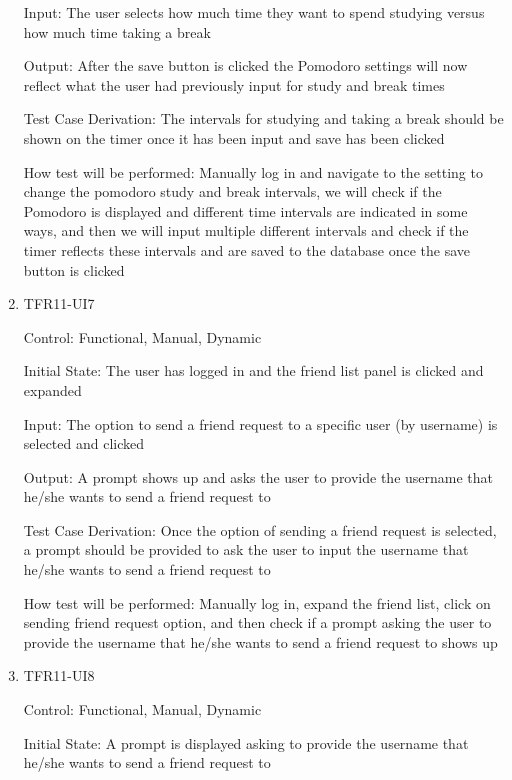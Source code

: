 \documentclass[12pt, titlepage]{article}
\begin{document}
\begin{enumerate}[resume]
  Input: The user selects how much time they want to spend studying versus how much time taking a break
            
  Output: After the save button is clicked the Pomodoro settings will now reflect what the user had previously input for study and break times
  
  Test Case Derivation: The intervals for studying and taking a break should be shown on the timer once it has been input and save has been clicked
            
  How test will be performed: Manually log in and navigate to the setting to change the pomodoro study and break intervals, we will check if the Pomodoro is displayed and different time intervals are indicated in some ways, and then we will input multiple different intervals and check if the timer reflects these intervals and are saved to the database once the save button is clicked 
  
  \item{TFR11-UI7\\} \label{TFR11-UI7}
  
  Control: Functional, Manual, Dynamic
            
  Initial State: The user has logged in and the friend list panel is clicked and expanded
            
  Input: The option to send a friend request to a specific user (by username) is selected and clicked 
            
  Output: A prompt shows up and asks the user to provide the username that he/she wants to send a friend request to
  
  Test Case Derivation: Once the option of sending a friend request is selected, a prompt should be provided to ask the user to input the username that he/she wants to send a friend request to
            
  How test will be performed: Manually log in, expand the friend list, click on sending friend request option, and then check if a prompt asking the user to provide the username that he/she wants to send a friend request to shows up
            
  \item{TFR11-UI8\\} \label{TFR11-UI8}
  
  Control: Functional, Manual, Dynamic
            
  Initial State: A prompt is displayed asking to provide the username that he/she wants to send a friend request to
            

\end{enumerate}
\end{document}
